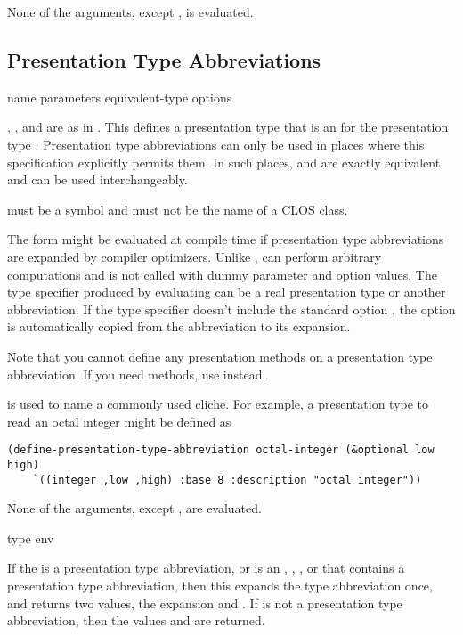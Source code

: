None of the arguments, except , is evaluated.


\subsection {Presentation Type Abbreviations}

 {name parameters equivalent-type 
                                                   \key options}

, , and  are as in
.  This defines a presentation type that is an
 for the presentation type .
Presentation type abbreviations can only be used in places where this
specification explicitly permits them.  In such places, 
and  are exactly equivalent and can be used interchangeably.

 must be a symbol and must not be the name of a CLOS class.

The  form might be evaluated at compile time if
presentation type abbreviations are expanded by compiler optimizers.  Unlike
,  can perform arbitrary computations and
is not called with dummy parameter and option values.  The type specifier
produced by evaluating  can be a real presentation type or
another abbreviation.  If the type specifier doesn't include the standard option
, the option is automatically copied from the abbreviation to
its expansion.

Note that you cannot define any presentation methods on a presentation type
abbreviation.  If you need methods, use  instead.

 is used to name a commonly used
cliche.  For example, a presentation type to read an octal integer might be
defined as
\begin{verbatim}
(define-presentation-type-abbreviation octal-integer (&optional low high) 
    `((integer ,low ,high) :base 8 :description "octal integer"))
\end{verbatim}

None of the arguments, except , are evaluated.


 {type \optional env}

If the   is a presentation type
abbreviation, or is an , , , or
 that contains a presentation type abbreviation, then
this expands the type abbreviation once, and returns two values, the expansion
and .  If  is not a presentation type abbreviation, then the
values  and  are returned.

